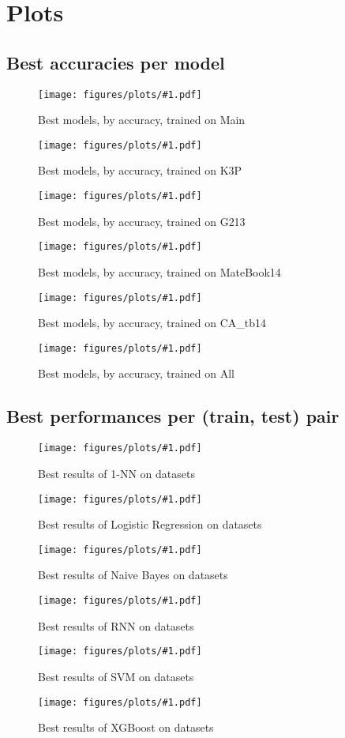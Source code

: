 \documentclass[../main.tex]{subfiles}
\begin{document}
\newcommand{\plot}[3]{%
\begin{figure}[ht]%
    \centering%
    \texttt{[image: figures/plots/\#1.pdf]}%
    \caption{#3}%
    \label{#2}%
\end{figure}%
}%

\vspace{-1.15cm}
\chapter{Plots}
\label{cha:plots}

\vspace{-1.4cm}
\section{Best accuracies per model}
\plot{best_acc_per_dataset/main_dataset}{fig:plot_best_acc_per_dataset_main}{Best models, by accuracy, trained on Main}
\plot{best_acc_per_dataset/k3p_dataset}{fig:plot_best_acc_per_dataset_k3p}{Best models, by accuracy, trained on K3P}
\plot{best_acc_per_dataset/g213_dataset}{fig:plot_best_acc_per_dataset_g213}{Best models, by accuracy, trained on G213}
\plot{best_acc_per_dataset/matebook14_dataset}{fig:plot_best_acc_per_dataset_matebook14}{Best models, by accuracy, trained on MateBook14}
\plot{best_acc_per_dataset/CA_tb14_dataset}{fig:plot_best_acc_per_dataset_CA_tb14}{Best models, by accuracy, trained on CA\_tb14}
\plot{best_acc_per_dataset/all_dataset}{fig:plot_best_acc_per_dataset_all}{Best models, by accuracy, trained on All}

\clearpage

\section{Best performances per (train, test) pair}
\plot{dataset_performances/knn_1}{fig:plot_dataset_performance_knn1}{Best results of 1-NN on datasets}
\plot{dataset_performances/logistic_regression}{fig:plot_dataset_performance_lr}{Best results of Logistic Regression on datasets}
\plot{dataset_performances/naive_bayes}{fig:plot_dataset_performanceodel_nb}{Best results of Naive Bayes on datasets}
\plot{dataset_performances/rnn}{fig:plot_dataset_performance_rnn}{Best results of RNN on datasets}
\plot{dataset_performances/svm}{fig:plot_dataset_performance_svm}{Best results of SVM on datasets}
\plot{dataset_performances/xgboost}{fig:plot_dataset_performance_xgb}{Best results of XGBoost on datasets}

\clearpage
\end{document}
